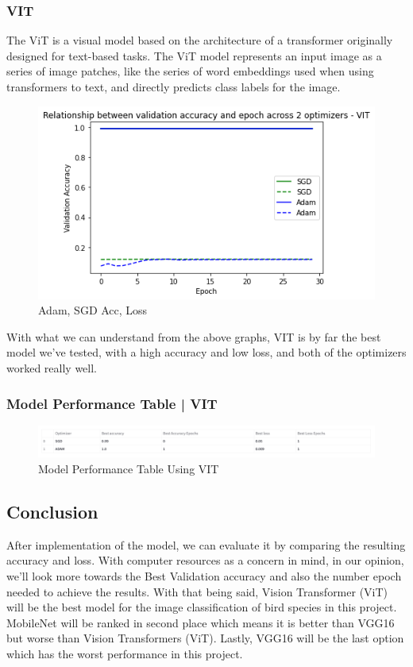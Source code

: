 \subsubsection*{VIT}
The ViT is a visual model based on the architecture of a transformer originally designed for text-based tasks. The ViT model represents an input image as a series of image patches, like the series of word embeddings used when using transformers to text, and directly predicts class labels for the image.

\begin{figure}[h]
\centering
\includegraphics[scale=0.40]{diagrams/vit/optimizer_comparison.png}
\caption{Adam, SGD Acc,  Loss}
\end{figure}

With what we can understand from the above graphs, VIT is by far the best model we've tested, with a high accuracy and low loss, and both of the optimizers worked really well. 

\pagebreak
\subsubsection{Model Performance Table | VIT}
\begin{figure}[h]
  \centering
  \includegraphics[scale=0.40]{vit-table.png}
  \caption{Model Performance Table Using VIT}
  \end{figure}

\subsection*{Conclusion}
After implementation of the model, we can evaluate it by comparing the resulting accuracy and loss. With computer resources as a concern in mind, in our opinion, we’ll look more towards the Best Validation accuracy and also the number epoch needed to achieve the results. With that being said, Vision Transformer (ViT) will be the best model for the image classification of bird species in this project. MobileNet will be ranked in second place which means it is better than VGG16 but worse than Vision Transformers (ViT). Lastly, VGG16 will be the last option which has the worst performance in this project.
